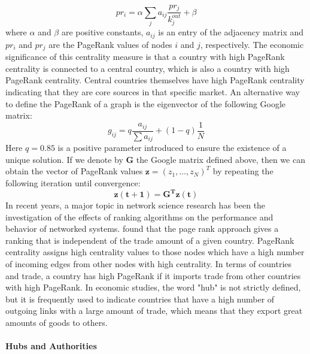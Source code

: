 \begin{equation}\label{eq:pagerank}
    pr_i = \alpha \sum_{j} a_{ij} \frac{pr_j}{k_j^{out}} + \beta
\end{equation}
where $\alpha$ and $\beta$ are positive constants, $a_{ij}$ is an entry of the adjacency matrix and $pr_i$ and $pr_j$ are the PageRank values of nodes $i$ and $j$, respectively. 
The economic significance of this centrality measure is that a country with high PageRank centrality is connected to a central country, which is also a country with high PageRank centrality. Central countries themselves have high PageRank centrality indicating that they are core sources in that specific market.
An alternative way to define the PageRank of a graph is the eigenvector of the following Google matrix:
\begin{equation}\label{eq:googlemat}
    g_{ij} = q \frac{a_{ij}}{\sum a_{ij}} + (1-q)\frac{1}{N}
\end{equation}
Here $q = 0.85$ is a positive parameter introduced to ensure the existence of a unique solution. If we denote by $\mathbf{G}$ the Google matrix defined above, then we can obtain the vector of PageRank values $\mathbf{z} = (z_1,\dots,z_N)^T$ by repeating the following iteration until convergence:
\begin{equation}
    \mathbf{z(t+1) = G^T z(t)}
\end{equation}
In recent years, a major topic in network science research has been the investigation of the effects of ranking algorithms on the performance and behavior of networked systems. \textcite{ermann2011google} found that the page rank approach gives a ranking that is independent of the trade amount of a given country.
PageRank centrality assigns high centrality values to those nodes which have a high number of incoming edges from other nodes with high centrality. In terms of countries and trade, a country has high PageRank if it imports trade from other countries with high PageRank. 
In economic studies, the word "hub" is not strictly defined, but it is frequently used to indicate countries that have a high number of outgoing links with a large amount of trade, which means that they export great amounts of goods to others.

\paragraph{Hubs and Authorities}

